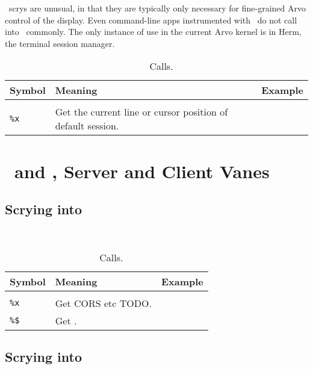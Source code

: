 \dill~scrys are unusual, in that they are typically only necessary for fine-grained Arvo control of the display.  Even command-line apps instrumented with \shoe~do not call into \dill~commonly.  The only instance of use in the current Arvo kernel is in Herm, the terminal session manager.

\begin{table}[h!]
  \begin{center}
    \caption{\dill~\dotket~Calls.}
    \label{ha:dill}
    \begin{tabular}{lll}
      Symbol & Meaning & Example \\
      \hline \\
      \texttt{\%x} & Get the current line or cursor position of default session. & \\
    \end{tabular}
  \end{center}
\end{table}


\section[\eyre~\&~\iris]{\eyre~and \iris, Server and Client Vanes}

\subsection{Scrying into \eyre}

\eyre~

\begin{table}[h!]
  \begin{center}
    \caption{\jael~\dotket~Calls.}
    \label{ha:iris}
    \begin{tabular}{lll}
      Symbol & Meaning & Example \\
      \hline \\
      \texttt{\%x} & Get CORS etc TODO. & \\
      \texttt{\%\$} & Get . & \\  %
    \end{tabular}
  \end{center}
\end{table}

\subsection{Scrying into \iris}

